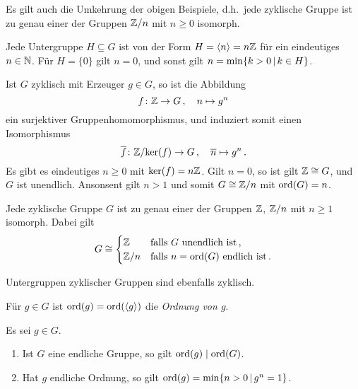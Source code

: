 Es gilt auch die Umkehrung der obigen Beispiele, d.h.\ jede zyklische Gruppe ist zu genau einer der Gruppen $\mathbb{Z}/n$ mit $n \geq 0$ isomorph.

\begin{lemma}
  Jede Untergruppe $H \subseteq G$ ist von der Form $H = \langle n\rangle = n\mathbb{Z}$ für ein eindeutiges $n \in \mathbb{N}$.
  Für $H = \{0\}$ gilt $n = 0$, und sonst gilt $n = \min \{k > 0 \suchthat k \in H\}$.
\end{lemma}

Ist $G$ zyklisch mit Erzeuger $g \in G$, so ist die Abbildung
\[
          f
  \colon  \mathbb{Z}
  \to     G \,,
  \quad   n
  \mapsto g^n
\]
ein surjektiver Gruppenhomomorphismus, und induziert somit einen Isomorphismus
\[
          \overline{f}
  \colon  \mathbb{Z}/{\ker(f)}
  \to     G \,,
  \quad   \overline{n}
  \mapsto g^n \,.
\]
Es gibt es eindeutiges $n \geq 0$ mit $\ker(f) = n\mathbb{Z}$.
Gilt $n = 0$, so ist gilt $\mathbb{Z} \cong G$, und $G$ ist unendlich.
Ansonsent gilt $n > 1$ und somit $G \cong \mathbb{Z}/n$ mit $\operatorname{ord}(G) = n$.

\begin{corollary}
  Jede zyklische Gruppe $G$ ist zu genau einer der Gruppen $\mathbb{Z}$, $\mathbb{Z}/n$ mit $n \geq 1$ isomorph.
  Dabei gilt
  \[
          G
    \cong \begin{cases}
              \mathbb{Z}
            & \text{falls $G$ unendlich ist} \,,
          \\
              \mathbb{Z}/n
            & \text{falls $n = \operatorname{ord}(G)$ endlich ist} \,.
          \end{cases}
  \]
\end{corollary}

\begin{corollary}
  Untergruppen zyklischer Gruppen sind ebenfalls zyklisch.
\end{corollary}

\begin{definition}
  Für $g \in G$ ist $\operatorname{ord}(g) = \operatorname{ord}(\langle g\rangle)$ die \emph{Ordnung von $g$}.
\end{definition}

\begin{lemma}
  Es sei $g \in G$.
  \begin{enumerate}
    \item
      Ist $G$ eine endliche Gruppe, so gilt $\operatorname{ord}(g) \mathrel{|} \operatorname{ord}(G)$.
    \item
      Hat $g$ endliche Ordnung, so gilt $\ord{g} = \min \{ n > 0 \suchthat g^n = 1 \}$.
  \end{enumerate}
\end{lemma}

